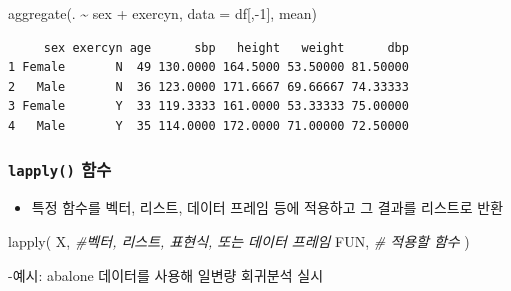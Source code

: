 \documentclass[
  11pt,
]{krantz}
\newenvironment{Shaded}{\begin{snugshade}}{\end{snugshade}}
\newcommand{\AttributeTok}[1]{\textcolor[rgb]{0.61,0.61,0.61}{#1}}
\newcommand{\CommentTok}[1]{\textcolor[rgb]{0.37,0.37,0.37}{\textit{#1}}}
\newcommand{\DecValTok}[1]{\textcolor[rgb]{0.06,0.06,0.06}{#1}}
\newcommand{\FunctionTok}[1]{\textcolor[rgb]{0,0,0}{#1}}
\newcommand{\NormalTok}[1]{#1}
\newcommand{\SpecialCharTok}[1]{\textcolor[rgb]{0,0,0}{#1}}
\providecommand{\tightlist}{%
  \setlength{\itemsep}{0pt}\setlength{\parskip}{0pt}}
\begin{document}
\begin{Shaded}
\begin{Highlighting}[]
\FunctionTok{aggregate}\NormalTok{(. }\SpecialCharTok{\textasciitilde{}}\NormalTok{ sex }\SpecialCharTok{+}\NormalTok{ exercyn, }
          \AttributeTok{data =}\NormalTok{ df[,}\SpecialCharTok{{-}}\DecValTok{1}\NormalTok{], }
\NormalTok{          mean)}
\end{Highlighting}
\end{Shaded}

\begin{verbatim}
     sex exercyn age      sbp   height   weight      dbp
1 Female       N  49 130.0000 164.5000 53.50000 81.50000
2   Male       N  36 123.0000 171.6667 69.66667 74.33333
3 Female       Y  33 119.3333 161.0000 53.33333 75.00000
4   Male       Y  35 114.0000 172.0000 71.00000 72.50000
\end{verbatim}

\normalsize

\hypertarget{lapply}{%
\subsubsection*{\texorpdfstring{\texttt{lapply()} 함수}{lapply() 함수}}\label{lapply}}


\begin{itemize}
\tightlist
\item
  특정 함수를 벡터, 리스트, 데이터 프레임 등에 적용하고 그 결과를 리스트로 반환
\end{itemize}

\footnotesize

\begin{Shaded}
\begin{Highlighting}[]
\FunctionTok{lapply}\NormalTok{(}
\NormalTok{ X, }\CommentTok{\#벡터, 리스트, 표현식, 또는  데이터 프레임}
\NormalTok{ FUN, }\CommentTok{\# 적용할 함수}
\NormalTok{)}
\end{Highlighting}
\end{Shaded}

\normalsize

-예시: abalone 데이터를 사용해 일변량 회귀분석 실시

\footnotesize
\end{document}
